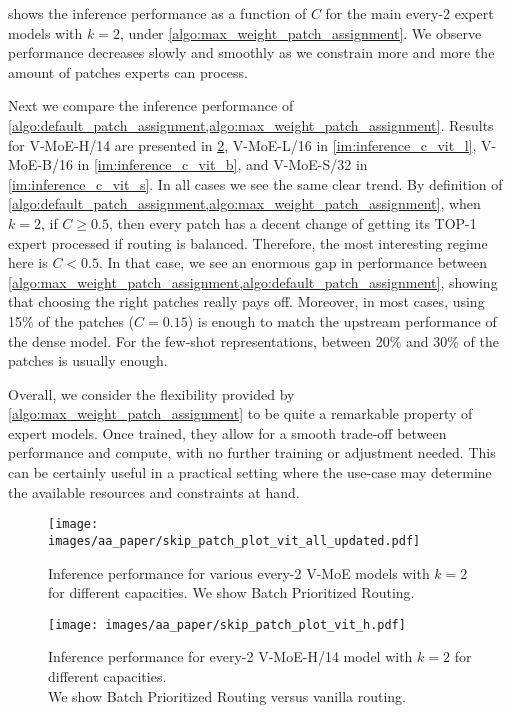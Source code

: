 \documentclass{article}
\newcommand{\abbv}{{V-MoE}}
\newcommand{\maxrouting}{Batch Prioritized Routing}
\begin{document}
 shows the inference performance as a function of $C$ for the main every-2 expert models with $k=2$, under \cref{algo:max_weight_patch_assignment}.
We observe performance decreases slowly and smoothly as we constrain more and more the amount of patches experts can process.

Next we compare the inference performance of \cref{algo:default_patch_assignment,algo:max_weight_patch_assignment}.
Results for \abbv{}-H/14 are presented in \cref{im:inference_c_vit_h}, \abbv{}-L/16 in \cref{im:inference_c_vit_l}, \abbv{}-B/16 in \cref{im:inference_c_vit_b}, and \abbv{}-S/32 in \cref{im:inference_c_vit_s}.
In all cases we see the same clear trend.
By definition of \cref{algo:default_patch_assignment,algo:max_weight_patch_assignment}, when $k=2$, if $C \ge 0.5$, then every patch has a decent change of getting its TOP-1 expert processed if routing is balanced.
Therefore, the most interesting regime here is $C < 0.5$.
In that case, we see an enormous gap in performance between \cref{algo:max_weight_patch_assignment,algo:default_patch_assignment}, showing that choosing the right patches really pays off.
Moreover, in most cases, using 15\% of the patches ($C = 0.15$) is enough to match the upstream performance of the dense model.
For the few-shot representations, between 20\% and 30\% of the patches is usually enough.

Overall, we consider the flexibility provided by \cref{algo:max_weight_patch_assignment} to be quite a remarkable property of expert models.
Once trained, they allow for a smooth trade-off between performance and compute, with no further training or adjustment needed.
This can be certainly useful in a practical setting where the use-case may determine the available resources and constraints at hand.


\begin{figure}[h]
\centering
\texttt{[image: images/aa\_paper/skip\_patch\_plot\_vit\_all\_updated.pdf]}
\caption{Inference performance for various every-2 V-MoE models with $k=2$ for different capacities.
We show \maxrouting{}.}
\label{im:inference_c_vit_all}
\end{figure}

\begin{figure}[h]
\centering
\texttt{[image: images/aa\_paper/skip\_patch\_plot\_vit\_h.pdf]}
\caption{Inference performance for every-2 V-MoE-H/14 model with $k=2$ for different capacities. \\
We show \maxrouting{} versus vanilla routing.}
\label{im:inference_c_vit_h}
\end{figure}
\end{document}
